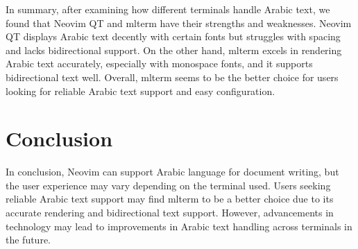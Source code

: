 \documentclass[12pt, letterpaper]{article}
\begin{document}
In summary, after examining how different terminals handle Arabic text, we found that Neovim QT and mlterm have their strengths and weaknesses. Neovim QT displays Arabic text decently with certain fonts but struggles with spacing and lacks bidirectional support. On the other hand, mlterm excels in rendering Arabic text accurately, especially with monospace fonts, and it supports bidirectional text well. Overall, mlterm seems to be the better choice for users looking for reliable Arabic text support and easy configuration. 

\section{Conclusion}
In conclusion, Neovim can support Arabic language for document writing, but the user experience may vary depending on the terminal used. Users seeking reliable Arabic text support may find mlterm to be a better choice due to its accurate rendering and bidirectional text support. However, advancements in technology may lead to improvements in Arabic text handling across terminals in the future.
\end{document}
